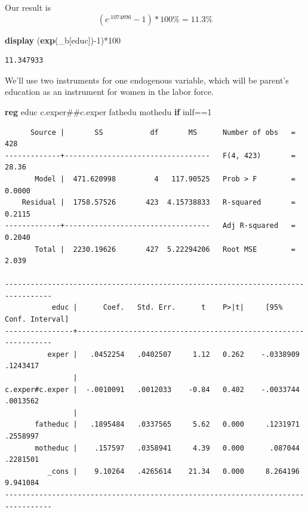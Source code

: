 \documentclass[
]{book}
\newenvironment{Shaded}{\begin{snugshade}}{\end{snugshade}}
\newcommand{\FunctionTok}[1]{\textcolor[rgb]{0.13,0.29,0.53}{\textbf{#1}}}
\newcommand{\KeywordTok}[1]{\textcolor[rgb]{0.13,0.29,0.53}{\textbf{#1}}}
\newcommand{\NormalTok}[1]{#1}
\begin{document}
Our result is \[ (e^{.1074896}-1)*100\% = 11.3\% \]

\begin{Shaded}
\begin{Highlighting}[]
\KeywordTok{display}\NormalTok{ (}\FunctionTok{exp}\NormalTok{(\_b[educ]){-}1)*100}
\end{Highlighting}
\end{Shaded}

\begin{verbatim}
11.347933
\end{verbatim}

We'll use two instruments for one endogenous variable, which will be parent's education as an instrument for women in the labor force.

\begin{Shaded}
\begin{Highlighting}[]
\KeywordTok{reg}\NormalTok{ educ c.exper\#\#c.exper fathedu mothedu }\KeywordTok{if}\NormalTok{ inlf==1}
\end{Highlighting}
\end{Shaded}

\begin{verbatim}
      Source |       SS           df       MS      Number of obs   =       428
-------------+----------------------------------   F(4, 423)       =     28.36
       Model |  471.620998         4   117.90525   Prob > F        =    0.0000
    Residual |  1758.57526       423  4.15738833   R-squared       =    0.2115
-------------+----------------------------------   Adj R-squared   =    0.2040
       Total |  2230.19626       427  5.22294206   Root MSE        =     2.039

---------------------------------------------------------------------------------
           educ |      Coef.   Std. Err.      t    P>|t|     [95% Conf. Interval]
----------------+----------------------------------------------------------------
          exper |   .0452254   .0402507     1.12   0.262    -.0338909    .1243417
                |
c.exper#c.exper |  -.0010091   .0012033    -0.84   0.402    -.0033744    .0013562
                |
       fatheduc |   .1895484   .0337565     5.62   0.000     .1231971    .2558997
       motheduc |    .157597   .0358941     4.39   0.000      .087044    .2281501
          _cons |    9.10264   .4265614    21.34   0.000     8.264196    9.941084
---------------------------------------------------------------------------------
\end{verbatim}
\end{document}
